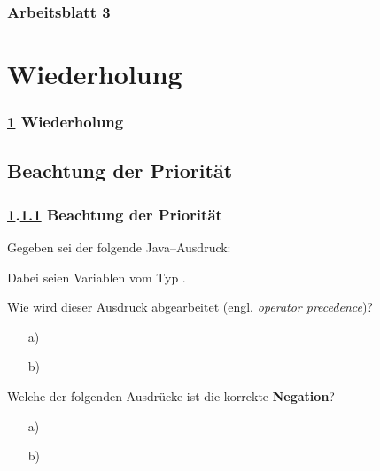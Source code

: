 \documentclass[9pt,german]{beamer}%
\begin{document}
\maketitle%
\addtocounter{framenumber}{-1}%


\begin{frame}
  \frametitle{Arbeitsblatt 3}%
\tableofcontents[hideallsubsections]
\end{frame}
\setcounter{exercise}{8}



\section{Wiederholung}\label{K:wdh}
\begin{frame}
  \frametitle{\ref{K:wdh} Wiederholung}%
\tableofcontents[current]
\end{frame}


\def\stitle{Beachtung der Priorit\"at}
\subsection{\stitle}\label{S:Priorit\"at}
\begin{frame}[fragile]%
  \frametitle{\ref{K:wdh}.\ref{S:Priorit\"at} \stitle}%
\medskip

Gegeben sei der folgende Java--Ausdruck:
\begin{center}
\end{center}
Dabei seien  Variablen vom Typ .
\medskip

Wie wird dieser Ausdruck abgearbeitet (engl. \emph{operator precedence})?
\begin{itemize}
  \item [a)] 
  \item[b)] 
\end{itemize}

Welche der folgenden Ausdr\"ucke ist die korrekte \textbf{Negation}?
\begin{itemize}
  \item [a)] 
  \item [b)] 
\end{itemize}

\end{frame}
\end{document}
